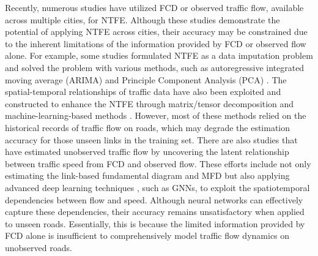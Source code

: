 Recently, numerous studies have utilized FCD or observed traffic flow, available across multiple cities, for NTFE. Although these studies demonstrate the potential of applying NTFE across cities, their accuracy may be constrained due to the inherent limitations of the information provided by FCD or observed flow alone. For example, some studies formulated NTFE as a data imputation problem and solved the problem with various methods, such as autoregressive integrated moving average (ARIMA) \citep{arima_flow} and Principle Component Analysis (PCA) \citep{BPCA_flow, PPCA_flow, KPPCA_flow}. The spatial-temporal relationships of traffic data have also been exploited and constructed to enhance the NTFE through matrix/tensor decomposition \citep{tensor_decomposition_flow_2,tensor_decomposition_flow_3,tensor_decomposition_4_flow,tensor_decomposition_5_flow,tensor_decomposition_6_flow} and machine-learning-based methods \citep{machine_flow_1,machine_flow_2}. However, most of these methods relied on the historical records of traffic flow on roads, which may degrade the estimation accuracy for those unseen links in the training set. There are also studies that have estimated unobserved traffic flow by uncovering the latent relationship between traffic speed from FCD and observed flow. These efforts include not only estimating the link-based fundamental diagram \citep{ross1988traffic, kerner2009introduction, anuar2015estimating, google_flow} and MFD \citep{est_MFD_1,est_MFD_2,est_MFD_3} but also applying advanced deep learning techniques \citep{tgc_rnn_flow,sgmc_flow, GNN_new_flow}, such as GNNs, to exploit the spatiotemporal dependencies between flow and speed. Although neural networks can effectively capture these dependencies, their accuracy remains unsatisfactory when applied to unseen roads. Essentially, this is because the limited information provided by FCD alone is insufficient to comprehensively model traffic flow dynamics on unobserved roads.

